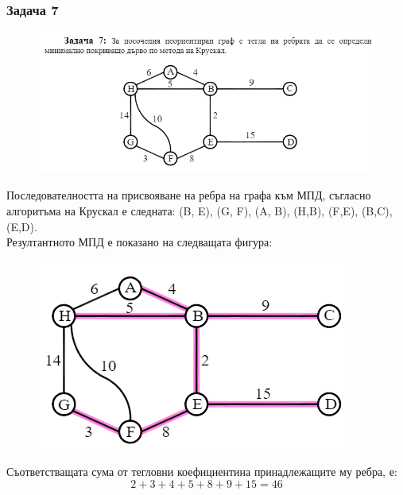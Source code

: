 \documentclass[fleqn, 12pt]{article}
\theoremstyle{definition}
\begin{document}
\subsubsection*{Задача 7}
\begin{figure} [htp!]
\includegraphics{Pics/Discrete math/ex8/ex8-task7.png}
\end{figure}
Последователността на присвояване на ребра на графа към МПД, съгласно алгоритъма на Крускал е следната: (B, E), (G, F), (A, B), (H,B), (F,E), (B,C), (E,D). \\
Резултантното МПД е показано на следващата фигура:
\begin{figure} [htp!]
\includegraphics{Pics/Discrete math/ex8/ex8-task7-1.png}
\end{figure}
Съответстващата сума от тегловни коефициентина принадлежащите му ребра, е:
$$ 2 + 3 + 4 + 5 + 8 + 9 + 15 = 46$$
\newpage
\end{document}
